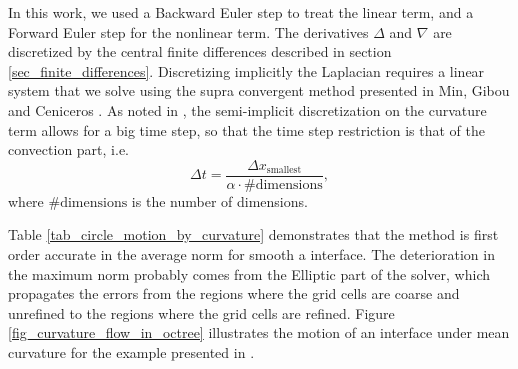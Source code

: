 \documentclass[english]{article}
\begin{document}
In this work, we used a Backward Euler step to treat the linear term, and a
Forward Euler step for the nonlinear term. The derivatives $\Delta$ and
$\nabla$ are discretized by the central finite differences described in
section \ref{sec_finite_differences}. Discretizing implicitly the Laplacian
requires a linear system that we solve using the supra convergent method
presented in Min, Gibou and Ceniceros \cite{Min::Poisson_AMR_Second_Order}.
As noted in \cite{Smereka:2003:Curvature}, the semi-implicit discretization
on the curvature term allows for a big time step, so that the time step
restriction is that of the convection part, i.e.
\begin{equation}
\Delta t=\frac{\Delta x_{\text{smallest}}}{\alpha\cdot\text{\# dimensions}},
\end{equation} where $\text{\# dimensions}$ is the number of dimensions.

Table \ref{tab_circle_motion_by_curvature} demonstrates that the method is
first order accurate in the average norm for smooth a interface. The
deterioration in the maximum norm probably comes from the Elliptic part of
the solver, which propagates the errors from the regions where the grid
cells are coarse and unrefined to the regions where the grid cells are
refined. Figure \ref{fig_curvature_flow_in_octree} illustrates the motion
of an interface under mean curvature for the example presented in
\cite{Smereka:2003:Curvature}.




\end{document}
